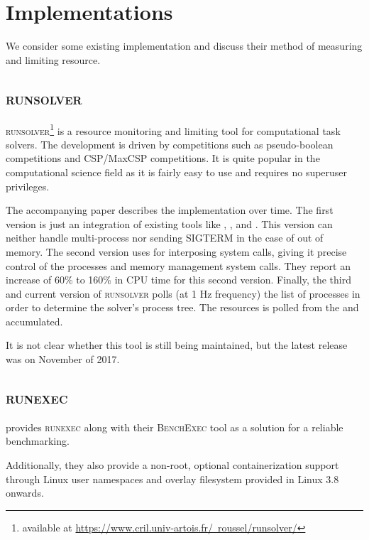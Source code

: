 \section{Implementations}

We consider some existing implementation and discuss their method of measuring and limiting resource.

\subsection{\textsc{runsolver}}

\textsc{runsolver}\footnote{available at \href{https://www.cril.univ-artois.fr/~roussel/runsolver/}{https://www.cril.univ-artois.fr/~roussel/runsolver/}} \citep{rousselControllingSolverExecution2011} is a resource monitoring and limiting tool for computational task solvers.
The development is driven by competitions such as pseudo-boolean competitions and CSP/MaxCSP competitions.
It is quite popular in the computational science field as it is fairly easy to use and requires no superuser privileges.

The accompanying paper describes the implementation over time.
The first version is just an integration of existing tools like , , and .
This version can neither handle multi-process nor sending SIGTERM in the case of out of memory.
The second version uses  for interposing system calls, giving it precise control of the processes and memory management system calls.
They report an increase of 60\% to 160\% in CPU time for this second version.
Finally, the third and current version of \textsc{runsolver} polls (at 1 Hz frequency) the list of processes in order to determine the solver's process tree.
The resources is polled from the  and accumulated.

It is not clear whether this tool is still being maintained, but the latest release was on November of 2017.


\subsection{\textsc{runexec}}

\citet{beyerReliableBenchmarkingRequirements2019} provides \textsc{runexec} along with their \textsc{BenchExec} tool as a solution for a reliable benchmarking.

Additionally, they also provide a non-root, optional containerization support through Linux user namespaces and overlay filesystem provided in Linux 3.8 onwards.

